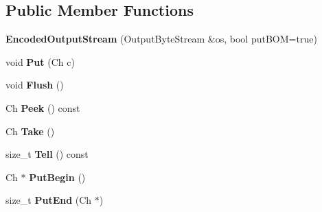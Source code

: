 \subsection*{Public Member Functions}
\begin{DoxyCompactItemize}
\item 
{\bfseries Encoded\+Output\+Stream} (Output\+Byte\+Stream \&os, bool put\+B\+OM=true)\hypertarget{class_encoded_output_stream_ad3360c613a30a6a15526ae9ad63bd004}{}\label{class_encoded_output_stream_ad3360c613a30a6a15526ae9ad63bd004}

\item 
void {\bfseries Put} (Ch c)\hypertarget{class_encoded_output_stream_a0f3c00f94c195a38d78c05ecda497481}{}\label{class_encoded_output_stream_a0f3c00f94c195a38d78c05ecda497481}

\item 
void {\bfseries Flush} ()\hypertarget{class_encoded_output_stream_a657188f6a9f0fae01a4012c288d3fd46}{}\label{class_encoded_output_stream_a657188f6a9f0fae01a4012c288d3fd46}

\item 
Ch {\bfseries Peek} () const \hypertarget{class_encoded_output_stream_aa1dbe6b921fe788f3229024fb5598647}{}\label{class_encoded_output_stream_aa1dbe6b921fe788f3229024fb5598647}

\item 
Ch {\bfseries Take} ()\hypertarget{class_encoded_output_stream_a90f5a5e1598316a417ef5b6ad3d49f36}{}\label{class_encoded_output_stream_a90f5a5e1598316a417ef5b6ad3d49f36}

\item 
size\+\_\+t {\bfseries Tell} () const \hypertarget{class_encoded_output_stream_ab580ac97f1a22c2a6abc4a31bb5c8272}{}\label{class_encoded_output_stream_ab580ac97f1a22c2a6abc4a31bb5c8272}

\item 
Ch $\ast$ {\bfseries Put\+Begin} ()\hypertarget{class_encoded_output_stream_a78934de4f76c9fa65238e65d3630cbc5}{}\label{class_encoded_output_stream_a78934de4f76c9fa65238e65d3630cbc5}

\item 
size\+\_\+t {\bfseries Put\+End} (Ch $\ast$)\hypertarget{class_encoded_output_stream_a818695f6d3fa8896e9d7d0fbdc7d4514}{}\label{class_encoded_output_stream_a818695f6d3fa8896e9d7d0fbdc7d4514}

\end{DoxyCompactItemize}
